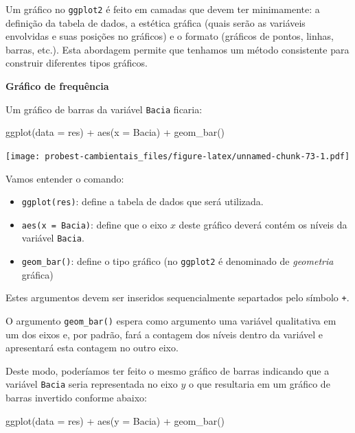 \documentclass[
]{book}
\newenvironment{Shaded}{\begin{snugshade}}{\end{snugshade}}
\newcommand{\AttributeTok}[1]{\textcolor[rgb]{0.77,0.63,0.00}{#1}}
\newcommand{\FunctionTok}[1]{\textcolor[rgb]{0.00,0.00,0.00}{#1}}
\newcommand{\NormalTok}[1]{#1}
\newcommand{\SpecialCharTok}[1]{\textcolor[rgb]{0.00,0.00,0.00}{#1}}
\begin{document}
Um gráfico no \texttt{ggplot2} é feito em camadas que devem ter minimamente: a definição da tabela de dados, a estética gráfica (quais serão as variáveis envolvidas e suas posições no gráficos) e o formato (gráficos de pontos, linhas, barras, etc.). Esta abordagem permite que tenhamos um método consistente para construir diferentes tipos gráficos.

\textbf{Gráfico de frequência}

Um gráfico de barras da variável \texttt{Bacia} ficaria:

\begin{Shaded}
\begin{Highlighting}[]
\FunctionTok{ggplot}\NormalTok{(}\AttributeTok{data =}\NormalTok{ res) }\SpecialCharTok{+}
  \FunctionTok{aes}\NormalTok{(}\AttributeTok{x =}\NormalTok{ Bacia) }\SpecialCharTok{+}
  \FunctionTok{geom\_bar}\NormalTok{()}
\end{Highlighting}
\end{Shaded}

\texttt{[image: probest-cambientais\_files/figure-latex/unnamed-chunk-73-1.pdf]}

Vamos entender o comando:

\begin{itemize}
\item
  \texttt{ggplot(res)}: define a tabela de dados que será utilizada.
\item
  \texttt{aes(x\ =\ Bacia)}: define que o eixo \(x\) deste gráfico deverá contém os níveis da variável \texttt{Bacia}.
\item
  \texttt{geom\_bar()}: define o tipo gráfico (no \texttt{ggplot2} é denominado de \emph{geometria} gráfica)
\end{itemize}

Estes argumentos devem ser inseridos sequencialmente separtados pelo símbolo \texttt{+}.

O argumento \texttt{geom\_bar()} espera como argumento uma variável qualitativa em um dos eixos e, por padrão, fará a contagem dos níveis dentro da variável e apresentará esta contagem no outro eixo.

Deste modo, poderíamos ter feito o mesmo gráfico de barras indicando que a variável \texttt{Bacia} seria representada no eixo \(y\) o que resultaria em um gráfico de barras invertido conforme abaixo:

\begin{Shaded}
\begin{Highlighting}[]
\FunctionTok{ggplot}\NormalTok{(}\AttributeTok{data =}\NormalTok{ res) }\SpecialCharTok{+}
  \FunctionTok{aes}\NormalTok{(}\AttributeTok{y =}\NormalTok{ Bacia) }\SpecialCharTok{+}
  \FunctionTok{geom\_bar}\NormalTok{()}
\end{Highlighting}
\end{Shaded}
\end{document}
